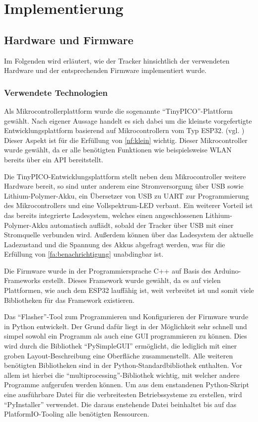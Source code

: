 \chapter{Implementierung} \label{chap:implementierung}

\section{Hardware und Firmware}

Im Folgenden wird erläutert, wie der Tracker hinsichtlich der verwendeten Hardware und der
entsprechenden Firmware implementiert wurde.

\subsection{Verwendete Technologien}\label{sec:hardware-used-technologies}

Als Mikrocontrollerplattform wurde die sogenannte \enquote{TinyPICO}-Plattform gewählt. Nach eigener
Aussage handelt es sich dabei um die kleinste vorgefertigte Entwicklungsplattform basierend auf
Mikrocontrollern vom Typ ESP32. (vgl. \cite{tinypico2020}) Dieser Aspekt ist für die Erfüllung von \ref{nf:klein} wichtig.
Dieser Mikrocontroller wurde gewählt, da er alle benötigten Funktionen wie beispielsweise \gls{WLAN}
bereits über ein \gls{API} bereitstellt.

Die TinyPICO-Entwicklungsplattform stellt neben dem Mikrocontroller weitere Hardware bereit, so sind
unter anderem
eine Stromversorgung über \gls{USB} sowie Lithium-Polymer-\gls{Akku}, ein Übersetzer von \gls{USB}
zu \gls{UART} zur Programmierung des Mikrocontrollers und eine Vollspektrum-\gls{LED} verbaut.
Ein weiterer Vorteil ist das bereits integrierte Ladesystem, welches einen angeschlossenen
Lithium-Polymer-\gls{Akku} automatisch auflädt, sobald der Tracker über \gls{USB} mit einer
Stromquelle verbunden wird. Außerdem können über das Ladesystem der aktuelle Ladezustand und die
Spannung des \glspl{Akku} abgefragt werden, was für die Erfüllung von \ref{fa:benachrichtigung}
unabdingbar ist.

Die Firmware wurde in der Programmiersprache C++ auf Basis des Arduino-Frameworks erstellt. Dieses
Framework wurde gewählt, da es auf vielen Plattformen, wie auch dem ESP32 lauffähig ist, weit
verbreitet ist und somit viele Bibliotheken für das Framework existieren.

Das \enquote{Flasher}-Tool zum Programmieren und Konfigurieren der Firmware wurde in Python
entwickelt.
Der Grund dafür liegt in der Möglichkeit sehr schnell und simpel sowohl ein Programm als auch eine \gls{GUI}
programmieren zu können.
Dies wird durch die Bibliothek \enquote{PySimpleGUI} ermöglicht, die lediglich mit einer groben Layout-Beschreibung
eine Oberfläche zusammenstellt.
Alle weiteren benötigten Bibliotheken sind in der Python-Standardbibliothek enthalten.
Vor allem ist hierbei die \enquote{multiprocessing}-Bibliothek wichtig, mit welcher andere Programme aufgerufen werden können.
Um aus dem enstandenen Python-Skript eine ausführbare Datei für die verbreitesten Betriebssysteme zu erstellen, wird \enquote{PyInstaller} verwendet.
Die daraus enstehende Datei beinhaltet bis auf das PlatformIO-Tooling alle benötigten Ressourcen.

